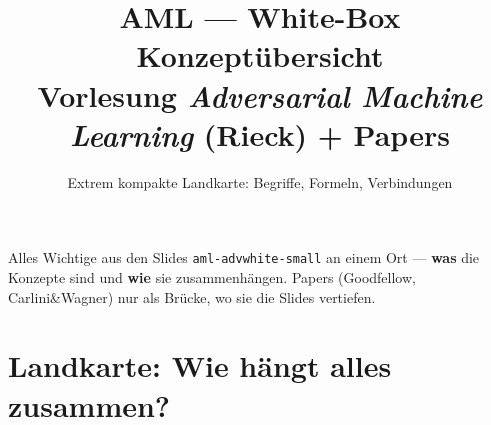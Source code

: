\documentclass[11pt,a4paper]{article}
\title{%
  \textbf{AML --- White-Box Konzeptübersicht}\\[0.25em]
  {\large Vorlesung \emph{Adversarial Machine Learning} (Rieck) + Papers}
}
\author{Extrem kompakte Landkarte: Begriffe, Formeln, Verbindungen}
\date{}
\begin{document}
\maketitle
\vspace{-1.4em}

\begin{keybox}
Alles Wichtige aus den Slides \texttt{aml-advwhite-small} an einem Ort ---
\textbf{was} die Konzepte sind und \textbf{wie} sie zusammenhängen.
Papers (Goodfellow, Carlini\&Wagner) nur als Brücke, wo sie die Slides vertiefen.
\end{keybox}

\section{Landkarte: Wie hängt alles zusammen?}
\end{document}
